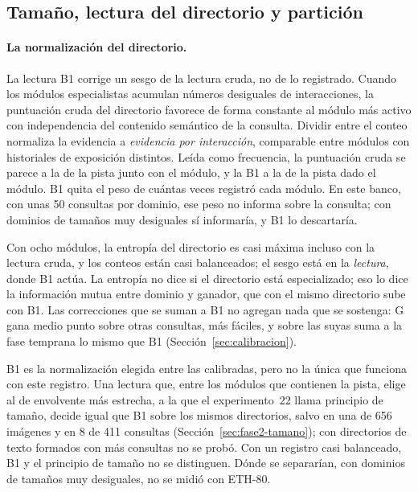\subsection{Tamaño, lectura del directorio y partición}
\label{fase:disc-tamano}
\label{sec:disc-b1}
\label{sec:disc-dominancia}

\paragraph{La normalización del directorio.}
La lectura B1 corrige un sesgo de la lectura cruda, no de lo registrado.
Cuando los módulos especialistas acumulan números desiguales de interacciones, la
puntuación cruda del directorio favorece de forma constante al módulo más activo con
independencia del contenido semántico de la consulta.
Dividir entre el conteo normaliza la evidencia a \textit{evidencia por interacción},
comparable entre módulos con historiales de exposición distintos.
Leída como frecuencia, la puntuación cruda se parece a la de la pista junto con el
módulo, y la B1 a la de la pista dado el módulo.
B1 quita el peso de cuántas veces registró cada módulo.
En este banco, con unas 50 consultas por dominio, ese peso no informa sobre la consulta;
con dominios de tamaños muy desiguales sí informaría, y B1 lo descartaría.

Con ocho módulos, la entropía del directorio es casi máxima incluso con la lectura
cruda, y los conteos están casi balanceados; el sesgo está en la \emph{lectura}, donde
B1 actúa.
La entropía no dice si el directorio está especializado; eso lo dice la información
mutua entre dominio y ganador, que con el mismo directorio sube con B1.
Las correcciones que se suman a B1 no agregan nada que se sostenga: G gana medio punto
sobre otras consultas, más fáciles, y sobre las suyas suma a la fase temprana lo mismo
que B1 (Sección~\ref{sec:calibracion}).

B1 es la normalización elegida entre las calibradas, pero no la única que funciona con
este registro.
Una lectura que, entre los módulos que contienen la pista, elige al de envolvente más
estrecha, a la que el experimento~22 llama principio de tamaño, decide igual que B1
sobre los mismos directorios, salvo en una de 656 imágenes y en 8 de 411 consultas
(Sección~\ref{sec:fase2-tamano}); con directorios de texto formados con más consultas
no se probó.
Con un registro casi balanceado, B1 y el principio de tamaño no se distinguen.
Dónde se separarían, con dominios de tamaños muy desiguales, no se midió con ETH-80.

